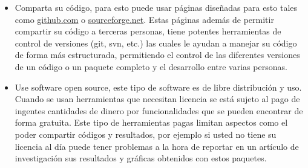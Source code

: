 \begin{itemize}
\item Comparta su código, para esto puede usar páginas diseñadas para esto
tales como \url{github.com} o \url{sourceforge.net}. Estas páginas además
de permitir compartir su código a terceras personas, tiene potentes 
herramientas de control de versiones (git, svn, etc.) las cuales le ayudan 
a manejar su código de forma más estructurada, permitiendo el control de 
las diferentes versiones de un código o un paquete completo y el desarrollo
entre varias personas.

\item Use software open source, este tipo de software es de libre 
distribución y uso. Cuando se usan herramientas que necesitan licencia se
está sujeto al pago de ingentes cantidades de dinero por funcionalidades
que se pueden encontrar de forma gratuita. Este tipo de herramientas pagas
limitan aspectos como el poder compartir códigos y resultados, por ejemplo 
si usted no tiene su licencia al día puede tener problemas a la hora de 
reportar en un artículo de investigación sus resultados y gráficas obtenidos 
con estos paquetes.

\end{itemize}


